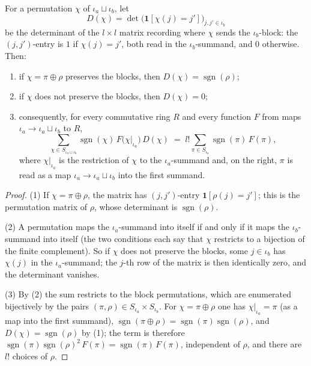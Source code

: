 \begin{lemma}
\label{lem:perm-block-collapse}
\leanok
For a permutation $\chi$ of $\iota_a \sqcup \iota_b$, let
\[
D(\chi) = \det\big(\mathbf{1}[\chi(j) = j']\big)_{j, j' \in \iota_b}
\]
be the determinant of the $l \times l$ matrix recording where $\chi$ sends the $\iota_b$-block: the $(j,j')$-entry is $1$ if $\chi(j) = j'$, both read in the $\iota_b$-summand, and $0$ otherwise. Then:
\begin{enumerate}
\item if $\chi = \pi \oplus \rho$ preserves the blocks, then $D(\chi) = \operatorname{sgn}(\rho)$;
\item if $\chi$ does not preserve the blocks, then $D(\chi) = 0$;
\item consequently, for every commutative ring $R$ and every function $F$ from maps $\iota_a \to \iota_a \sqcup \iota_b$ to $R$,
\[
\sum_{\chi \in S_{\iota_a \sqcup \iota_b}} \operatorname{sgn}(\chi)\, F\big(\chi|_{\iota_a}\big)\, D(\chi)
  \;=\; l! \sum_{\pi \in S_{\iota_a}} \operatorname{sgn}(\pi)\, F(\pi),
\]
where $\chi|_{\iota_a}$ is the restriction of $\chi$ to the $\iota_a$-summand and, on the right, $\pi$ is read as a map $\iota_a \to \iota_a \sqcup \iota_b$ into the first summand.
\end{enumerate}
\end{lemma}
\begin{proof}
\leanok
(1) If $\chi = \pi \oplus \rho$, the matrix has $(j,j')$-entry $\mathbf{1}[\rho(j) = j']$; this is the permutation matrix of $\rho$, whose determinant is $\operatorname{sgn}(\rho)$.

(2) A permutation maps the $\iota_a$-summand into itself if and only if it maps the $\iota_b$-summand into itself (the two conditions each say that $\chi$ restricts to a bijection of the finite complement). So if $\chi$ does not preserve the blocks, some $j \in \iota_b$ has $\chi(j)$ in the $\iota_a$-summand; the $j$-th row of the matrix is then identically zero, and the determinant vanishes.

(3) By (2) the sum restricts to the block permutations, which are enumerated bijectively by the pairs $(\pi, \rho) \in S_{\iota_a} \times S_{\iota_b}$. For $\chi = \pi \oplus \rho$ one has $\chi|_{\iota_a} = \pi$ (as a map into the first summand), $\operatorname{sgn}(\pi \oplus \rho) = \operatorname{sgn}(\pi)\operatorname{sgn}(\rho)$, and $D(\chi) = \operatorname{sgn}(\rho)$ by (1); the term is therefore $\operatorname{sgn}(\pi)\operatorname{sgn}(\rho)^2\, F(\pi) = \operatorname{sgn}(\pi)\, F(\pi)$, independent of $\rho$, and there are $l!$ choices of $\rho$.
\end{proof}

